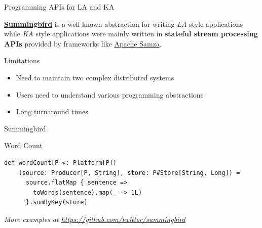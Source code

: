 \documentclass[newPxFont]{beamer}
\begin{document}

\begin{frame}{Programming APIs for LA and KA}

\href{https://github.com/twitter/summingbird}{\textbf{Summingbird}} is a well known abstraction for writing \textit{LA} style applications while \textit{KA} style applications were mainly written in \textbf{stateful stream processing APIs} provided by frameworks like \href{http://samza.apache.org}{Apache Samza}.

\begin{block}{Limitations}
\begin{itemize}
	\item Need to maintain two complex distributed systems
	\item Users need to understand various programming abstractions 
	\item Long turnaround times
\end{itemize}
\end{block}

\end{frame}


\begin{frame}[fragile]{Summingbird}
\begin{exampleblock}{Word Count}
\begin{verbatim}
def wordCount[P <: Platform[P]]
    (source: Producer[P, String], store: P#Store[String, Long]) =
      source.flatMap { sentence =>
        toWords(sentence).map(_ -> 1L)
      }.sumByKey(store)
\end{verbatim}
\end{exampleblock}
\vspace{-1.5em}
\begin{flushright}
\tiny\textit{More examples at \url{https://github.com/twitter/summingbird}}
\end{flushright}
\end{frame}

\end{document}
